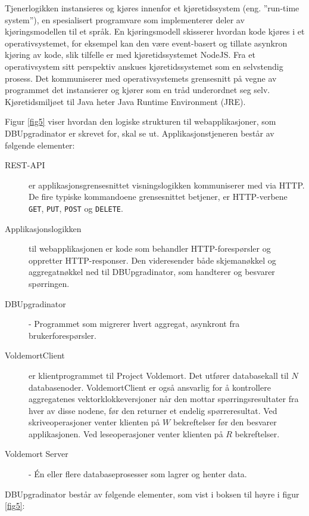 Tjenerlogikken instansieres og kjøres innenfor et kjøretidssystem (eng. ''run-time system''), en spesialisert programvare som implementerer deler av kjøringsmodellen til et språk. En kjøringsmodell skisserer hvordan kode kjøres i et operativsystemet, for eksempel kan den være event-basert og tillate asynkron kjøring av kode, slik tilfelle er med kjøretidssystemet NodeJS. Fra et operativsystem sitt perspektiv anskues kjøretidssystemet som en selvstendig prosess. Det kommuniserer med operativsystemets grensesnitt på vegne av programmet det instansierer og kjører som en tråd underordnet seg selv. Kjøretidsmiljøet til Java heter Java Runtime Environment (JRE).

Figur \ref{fig5} viser hvordan den logiske strukturen til webapplikasjoner, som DBUpgradinator er skrevet for, skal se ut. Applikasjonstjeneren består av følgende elementer:

\begin{description}
  \item [REST-API] er applikasjonsgrensesnittet visningslogikken kommuniserer med via HTTP. De fire typiske kommandoene grensesnittet betjener, er HTTP-verbene \texttt{GET}, \texttt{PUT}, \texttt{POST} og \texttt{DELETE}.
  \item [Applikasjonslogikken] til webapplikasjonen er kode som behandler HTTP-forespørsler og oppretter HTTP-responser. Den videresender både skjemanøkkel og aggregatnøkkel ned til DBUpgradinator, som handterer og besvarer spørringen.
  \item [DBUpgradinator] - Programmet som migrerer hvert aggregat, asynkront fra brukerforespørsler.
  \item [VoldemortClient] er klientprogrammet til Project Voldemort. Det utfører databasekall til \(N\) databasenoder. VoldemortClient er også ansvarlig for å kontrollere aggregatenes vektorklokke\-versjoner når den mottar spørringsresultater fra hver av disse nodene, før den returner et endelig spørreresultat. Ved skriveoperasjoner venter klienten på \(W\) bekreftelser før den besvarer applikasjonen. Ved leseoperasjoner  venter klienten på \(R\) bekreftelser. 
  \item [Voldemort Server] - Én eller flere databaseprosesser som lagrer og henter data.
\end{description}

DBUpgradinator består av følgende elementer, som vist i boksen til høyre i figur \ref{fig5}:

